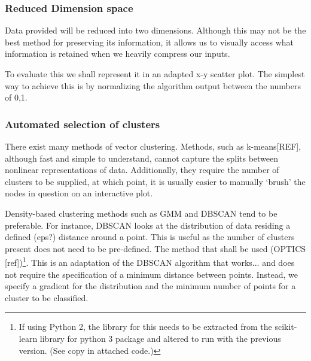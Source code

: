%

\subsubsection{Reduced Dimension space}
Data provided will be reduced into two dimensions. Although this may not be the best method for preserving its information, it allows us to visually access what information is retained when we heavily compress our inputs.

To evaluate this we shall represent it in an adapted x-y scatter plot. The simplest way to achieve this is by normalizing the algorithm output between the numbers of {0,1}.


\subsubsection{Automated selection of clusters}
There exist many methods of vector clustering. Methods, such as k-means[REF], although fast and simple to understand, cannot capture the splits between nonlinear representations of data. Additionally, they require the number of clusters to be supplied, at which point, it is usually easier to manually `brush' the nodes in question on an interactive plot.

Density-based clustering methods such as GMM and DBSCAN \cite{scikit,DBSCAN} tend to be preferable. For instance, DBSCAN looks at the distribution of data residing a defined (eps?) distance around a point. This is useful as the number of clusters present does not need to be pre-defined. The method that shall be used (OPTICS [ref])\footnote{ If using Python 2, the library for this needs to be extracted from the scikit-learn library for python 3 package and altered to run with the previous version. (See copy in attached code.)}. This is an adaptation of the DBSCAN algorithm that works... and does not require the specification of a minimum distance between points. Instead, we specify a gradient for the distribution and the minimum number of points for a cluster to be classified.

